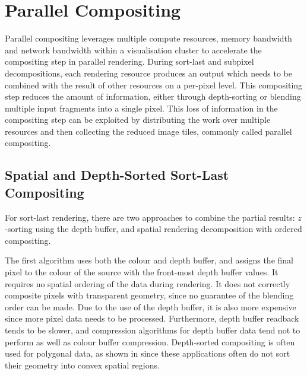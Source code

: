 \section{Parallel Compositing\label{sparcomp}}

Parallel compositing leverages multiple compute resources, memory bandwidth and
network bandwidth within a visualisation cluster to accelerate the compositing
step in parallel rendering. During sort-last and subpixel decompositions, each
rendering resource produces an output which needs to be combined with the
result of other resources on a per-pixel level. This compositing step reduces
the amount of information, either through depth-sorting or blending multiple
input fragments into a single pixel. This loss of information in the
compositing step can be exploited by distributing the work over multiple
resources and then collecting the reduced image tiles, commonly called parallel
compositing.

\subsection{Spatial and Depth-Sorted Sort-Last Compositing}

For sort-last rendering, there are two approaches to combine the partial
results: $z$-sorting using the depth buffer, and spatial rendering
decomposition with ordered compositing.

The first algorithm uses both the colour and depth buffer, and assigns the final
pixel to the colour of the source with the front-most depth buffer values. It
requires no spatial ordering of the data during rendering. It does not
correctly composite pixels with transparent geometry, since no guarantee of the
blending order can be made. Due to the use of the depth buffer, it is also more
expensive since more pixel data needs to be processed. Furthermore, depth
buffer readback tends to be slower, and compression algorithms for depth buffer
data tend not to perform as well as colour buffer compression. Depth-sorted
compositing is often used for polygonal data, as shown in  since
these applications often do not sort their geometry into convex spatial
regions.

